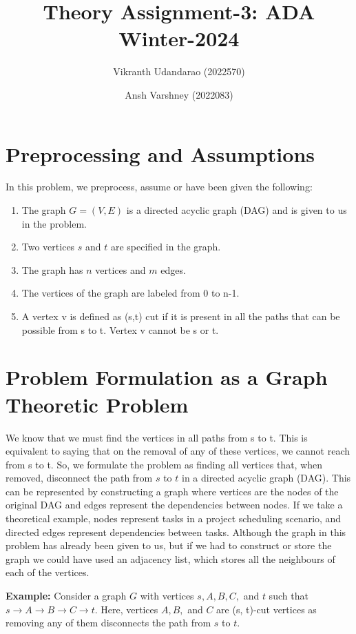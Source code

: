 \documentclass{article}
\title{Theory Assignment-3: ADA Winter-2024}
\author{Vikranth Udandarao (2022570) \and Ansh Varshney (2022083)}
\date{}
\begin{document}
\maketitle


\section{Preprocessing and Assumptions}
    In this problem, we preprocess, assume or have been given the following:

    \begin{enumerate}
        \item The graph $G = (V, E)$ is a directed acyclic graph (DAG) and is given to us in the problem.
        \item Two vertices $s$ and $t$ are specified in the graph.
        \item The graph has $n$ vertices and $m$ edges.
        \item The vertices of the graph are labeled from 0 to n-1.
        \item A vertex v is defined as (s,t) cut if it is present in all the paths that can be possible from s to t. Vertex v cannot be s or t.
    \end{enumerate}


\section{Problem Formulation as a Graph Theoretic Problem}
    We know that we must find the vertices in all paths from s to t. This is equivalent to saying that on the removal of any of these vertices, we cannot reach from s to t. So, we formulate the problem as finding all vertices that, when removed, disconnect the path from $s$ to $t$ in a directed acyclic graph (DAG). This can be represented by constructing a graph where vertices are the nodes of the original DAG and edges represent the dependencies between nodes. If we take a theoretical example, nodes represent tasks in a project scheduling scenario, and directed edges represent dependencies between tasks. Although the graph in this problem has already been given to us, but if we had to construct or store the graph we could have used an adjacency list, which stores all the neighbours of each of the vertices.

    \textbf{Example:}
        Consider a graph $G$ with vertices $s, A, B, C,$ and $t$ such that $s \rightarrow A \rightarrow B \rightarrow C \rightarrow t$. Here, vertices $A, B,$ and $C$ are (s, t)-cut vertices as removing any of them disconnects the path from $s$ to $t$.
\end{document}
